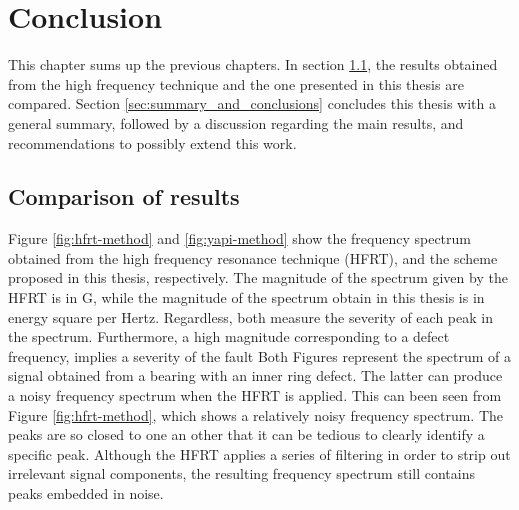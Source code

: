 \documentclass[../Main/thesis.tex]{subfiles}
\begin{document}
	\chapter[Conclusions]{Conclusion}
	\label{sec:conclusions}
	 This chapter sums up the previous chapters. In section \ref{sec:comp}, the results obtained from the high frequency technique and the one presented in this thesis are compared.
	 Section \ref{sec:summary_and_conclusions} concludes this thesis with a general summary, followed by a discussion regarding the main results, and recommendations to possibly extend this work.

	
	\section{Comparison of results}
		\label{sec:comp}
	Figure \ref{fig:hfrt-method} and \ref{fig:yapi-method} show the frequency spectrum obtained from the high frequency resonance technique (HFRT), and the scheme proposed in this thesis, respectively. The magnitude of the spectrum given by the HFRT is in G, while the magnitude of the spectrum obtain in this thesis is in energy square per Hertz. Regardless, both measure the severity of each peak in the spectrum. Furthermore, a high magnitude corresponding to a defect frequency, implies a severity of the fault
	\justify
	 Both Figures represent the spectrum of a signal obtained from a bearing with an inner ring defect. The latter can produce a noisy frequency spectrum when the HFRT is applied. This can been seen from Figure \ref{fig:hfrt-method}, which shows a relatively noisy frequency spectrum. The peaks are so closed to one an other that it can be tedious to clearly identify a specific peak.
	Although the HFRT applies a series of filtering in order to strip out irrelevant signal components, the resulting frequency spectrum still contains  peaks embedded in noise.
	
\end{document}
